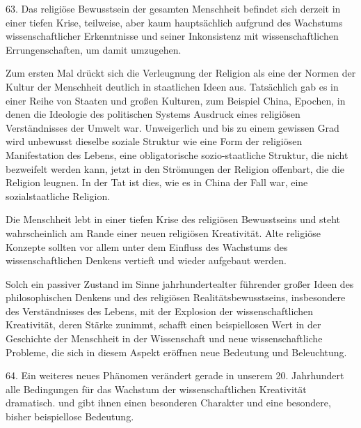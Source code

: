 \documentclass[11pt,a4paper]{book}
\begin{document}
63. Das religiöse Bewusstsein der gesamten Menschheit befindet sich derzeit in einer tiefen Krise, teilweise, aber kaum hauptsächlich aufgrund des Wachstums wissenschaftlicher Erkenntnisse und seiner Inkonsistenz mit wissenschaftlichen Errungenschaften, um damit umzugehen.



Zum ersten Mal drückt sich die Verleugnung der Religion als eine der Normen der Kultur der Menschheit deutlich in staatlichen Ideen aus. Tatsächlich gab es in einer Reihe von Staaten und großen Kulturen, zum Beispiel China, Epochen, in denen die Ideologie des politischen Systems Ausdruck eines religiösen Verständnisses der Umwelt war. Unweigerlich und bis zu einem gewissen Grad wird unbewusst dieselbe soziale Struktur wie eine Form der religiösen Manifestation des Lebens, eine obligatorische sozio-staatliche Struktur, die nicht bezweifelt werden kann, jetzt in den Strömungen der Religion offenbart, die die Religion leugnen. In der Tat ist dies, wie es in China der Fall war, eine sozialstaatliche Religion.



Die Menschheit lebt in einer tiefen Krise des religiösen Bewusstseins und steht wahrscheinlich am Rande einer neuen religiösen Kreativität. Alte religiöse Konzepte sollten vor allem unter dem Einfluss des Wachstums des wissenschaftlichen Denkens vertieft und wieder aufgebaut werden.



Solch ein passiver Zustand im Sinne jahrhundertealter führender großer Ideen des philosophischen Denkens und des religiösen Realitätsbewusstseins, insbesondere des Verständnisses des Lebens, mit der Explosion der wissenschaftlichen Kreativität, deren Stärke zunimmt, schafft einen beispiellosen Wert in der Geschichte der Menschheit in der Wissenschaft und neue wissenschaftliche Probleme, die sich in diesem Aspekt eröffnen neue Bedeutung und Beleuchtung.



64. Ein weiteres neues Phänomen verändert gerade in unserem 20. Jahrhundert alle Bedingungen für das Wachstum der wissenschaftlichen Kreativität dramatisch. und gibt ihnen einen besonderen Charakter und eine besondere, bisher beispiellose Bedeutung.
\end{document}
